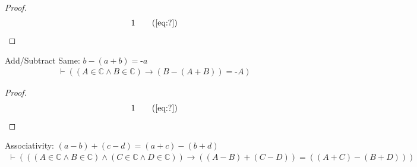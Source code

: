 \begin{proof}
\begin{align}
  1 &&  & &(\mbox{\ref{eq:?}})\notag
\end{align}
\end{proof}

\begin{lemma} Add/Subtract Same: $b \minus ( a + b ) =
\textrm{-} a$
\begin{align}
\vdash ( ( A \in \mathbb{C} \wedge B \in \mathbb{C} ) \rightarrow ( B \minus (
    A + B ) ) = \textrm{-} A )\label{eq:bl.npucan2}\tag{bl.npucan2}
\end{align}
\end{lemma}

\begin{proof}
\begin{align}
  1 &&  & &(\mbox{\ref{eq:?}})\notag
\end{align}
\end{proof}

\begin{lemma} Associativity: $( a \minus b ) + ( c
\minus d ) = ( a + c ) \minus ( b + d )$
\begin{align}
\vdash ( ( ( A \in \mathbb{C} \wedge B \in \mathbb{C} ) \wedge ( C \in
    \mathbb{C} \wedge D \in \mathbb{C} ) ) \rightarrow ( ( A \minus B ) + ( C
    \minus D ) ) = ( ( A + C ) \minus ( B + D ) )
    )\label{eq:bl.subadd4}\tag{bl.subadd4}
\end{align}
\end{lemma}

